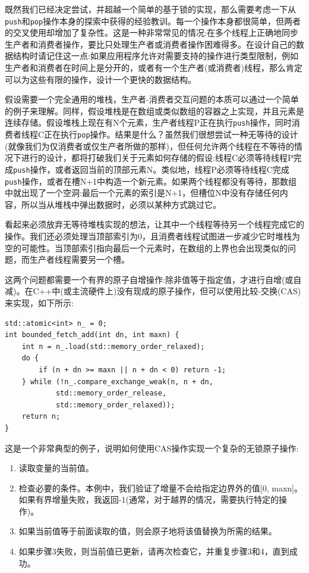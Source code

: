 
既然我们已经决定尝试，并超越一个简单的基于锁的实现，那么需要考虑一下从\texttt{push}和\texttt{pop}操作本身的探索中获得的经验教训。每一个操作本身都很简单，但两者的交叉使用却增加了复杂性。这是一种非常常见的情况:在多个线程上正确地同步生产者和消费者操作，要比只处理生产者或消费者操作困难得多。在设计自己的数据结构时请记住这一点:如果应用程序允许对需要支持的操作进行类型限制，例如生产者和消费者在时间上是分开的，或者有一个生产者(或消费者)线程，那么肯定可以为这些有限的操作，设计一个更快的数据结构。

假设需要一个完全通用的堆栈，生产者-消费者交互问题的本质可以通过一个简单的例子来理解。同样，假设堆栈是在数组或类似数组的容器之上实现，并且元素是连续存储。假设堆栈上现在有N个元素，生产者线程P正在执行\texttt{push}操作，同时消费者线程C正在执行\texttt{pop}操作。结果是什么？虽然我们很想尝试一种无等待的设计(就像我们为仅消费者或仅生产者所做的那样)，但任何允许两个线程在不等待的情况下进行的设计，都将打破我们关于元素如何存储的假设:线程C必须等待线程P完成\texttt{push}操作，或者返回当前的顶部元素N。类似地，线程P必须等待线程C完成\texttt{push}操作，或者在槽N+1中构造一个新元素。如果两个线程都没有等待，那数组中就出现了一个空洞:最后一个元素的索引是N+1，但槽位N中没有存储任何内容，所以当从堆栈中弹出数据时，必须以某种方式跳过它。

看起来必须放弃无等待堆栈实现的想法，让其中一个线程等待另一个线程完成它的操作。我们还必须处理当顶部索引为0，且消费者线程试图进一步减少它时堆栈为空的可能性。当顶部索引指向最后一个元素时，在数组的上界也会出现类似的问题，而生产者线程需要另一个槽。

这两个问题都需要一个有界的原子自增操作:除非值等于指定值，才进行自增(或自减)。在C++中(或主流硬件上)没有现成的原子操作，但可以使用比较-交换(CAS)来实现，如下所示:

\begin{lstlisting}[style=styleCXX]
std::atomic<int> n_ = 0;
int bounded_fetch_add(int dn, int maxn) {
	int n = n_.load(std::memory_order_relaxed);
	do {
		if (n + dn >= maxn || n + dn < 0) return -1;
	} while (!n_.compare_exchange_weak(n, n + dn,
			std::memory_order_release,
			std::memory_order_relaxed));
	return n;
}
\end{lstlisting}

这是一个非常典型的例子，说明如何使用CAS操作实现一个复杂的无锁原子操作:

\begin{enumerate}
\item 读取变量的当前值。
\item 检查必要的条件。本例中，我们验证了增量不会给指定边界外的值[0, maxn]。如果有界增量失败，我返回-1(通常，对于越界的情况，需要执行特定的操作)。
\item 如果当前值等于前面读取的值，则会原子地将该值替换为所需的结果。
\item 如果步骤3失败，则当前值已更新，请再次检查它，并重复步骤3和4，直到成功。
\end{enumerate}

